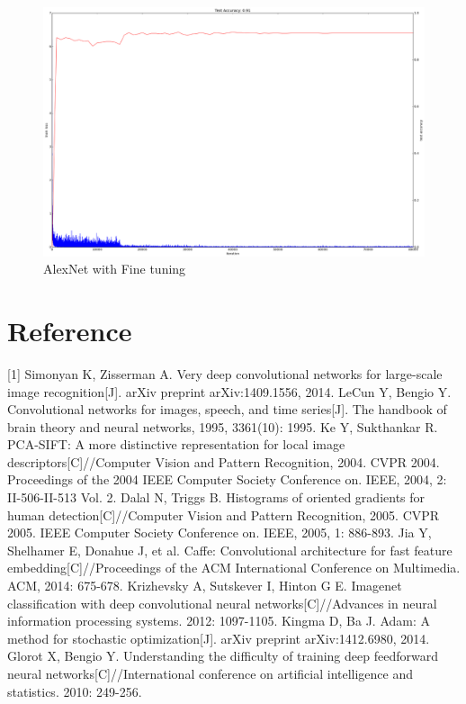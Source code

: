 \documentclass{article}
\begin{document}
\begin{figure}
	\centering
	\includegraphics[width=0.9\columnwidth]{final_f1}
	\caption{AlexNet with Fine tuning}
	\label{fig:7}
\end{figure}
\section{Reference} 
[1] Simonyan K, Zisserman A. Very deep convolutional networks for large-scale image recognition[J]. arXiv preprint arXiv:1409.1556, 2014. \newline
[2] LeCun Y, Bengio Y. Convolutional networks for images, speech, and time series[J]. The handbook of brain theory and neural networks, 1995, 3361(10): 1995. \newline
[3] Ke Y, Sukthankar R. PCA-SIFT: A more distinctive representation for local image descriptors[C]//Computer Vision and Pattern Recognition, 2004. CVPR 2004. Proceedings of the 2004 IEEE Computer Society Conference on. IEEE, 2004, 2: II-506-II-513 Vol. 2. \newline
[4] Dalal N, Triggs B. Histograms of oriented gradients for human detection[C]//Computer Vision and Pattern Recognition, 2005. CVPR 2005. IEEE Computer Society Conference on. IEEE, 2005, 1: 886-893. \newline
[5] Jia Y, Shelhamer E, Donahue J, et al. Caffe: Convolutional architecture for fast feature embedding[C]//Proceedings of the ACM International Conference on Multimedia. ACM, 2014: 675-678. \newline
[6] Krizhevsky A, Sutskever I, Hinton G E. Imagenet classification with deep convolutional neural networks[C]//Advances in neural information processing systems. 2012: 1097-1105. \newline
[7] Kingma D, Ba J. Adam: A method for stochastic optimization[J]. arXiv preprint arXiv:1412.6980, 2014. \newline
[8] Glorot X, Bengio Y. Understanding the difficulty of training deep feedforward neural networks[C]//International conference on artificial intelligence and statistics. 2010: 249-256. \newline
\end{document}
